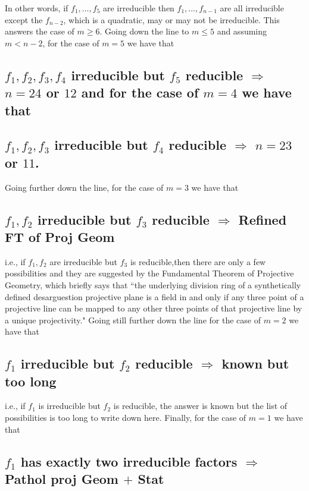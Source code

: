 In other words, if $f_{1}, \ldots, f_{5}$ are irreducible then $f_{1}, \ldots, f_{n-1}$ are all irreducible except the $f_{n-2}$, which is a quadratic, may or may not be irreducible. This answers the case of $m \geq 6$. Going down the line  to $m \leq 5$ and assuming $m<n-2$, for the case of $m=5$ we have that

\subsection{$f_{1}, f_{2}, f_{3}, f_{4}$ irreducible but $f_{5}$ reducible $\Rightarrow$ $n=24$ or $12$ and for the case of $m=4$ we have that}\label{chap1-sec2.2}

\subsection{$f_{1}, f_{2}, f_{3}$ irreducible but $f_{4}$ reducible $\Rightarrow$ $n=23$ or $11$.}\label{chap1-sec2.3}

Going further down the line, for the case of $m=3$ we have that

\subsection{$f_{1}, f_{2}$ irreducible but $f_{3}$ reducible $\Rightarrow$ Refined FT of Proj Geom}\label{chap1-sec2.4}\pageoriginale

i.e., if $f_{1}, f_{2}$ are irreducible but $f_{3}$ is reducible,then there are only a few possibilities and they are suggested by the Fundamental Theorem  of  Projective Geometry, which briefly says that ``the underlying division ring of a synthetically defined desarguestion projective plane is a field in and only if any three point of a projective line can be mapped to any other three points of that projective line by a unique projectivity." Going still further down the line for the case of $m=2$ we have that   

\subsection{$f_{1}$ irreducible but $f_{2}$ reducible $\Rightarrow$ known but too long}\label{chap1-sec2.5}

i.e., if $f_{1}$ is irreducible but $f_{2}$ is reducible, the answer is known but the list of possibilities is too long to write down here. Finally, for the case of $m=1$ we have that

\subsection{$f_{1}$ has exactly two irreducible factors $\Rightarrow$ Pathol proj Geom $+$ Stat}\label{chap1-sec2.6}

